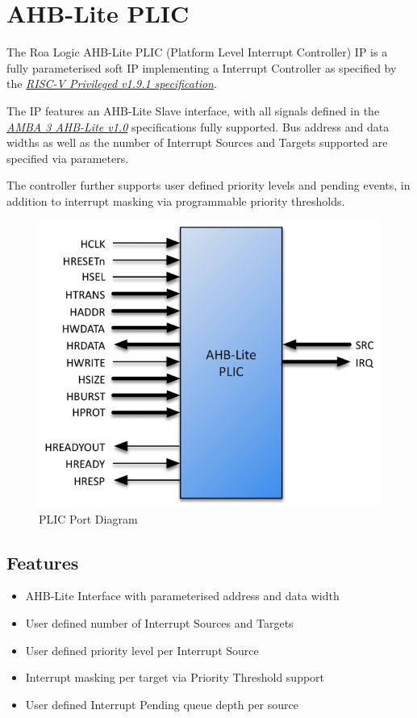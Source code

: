 \section{AHB-Lite PLIC}

The Roa Logic AHB-Lite PLIC (Platform Level Interrupt Controller) IP is a fully parameterised soft IP implementing a Interrupt Controller as specified by the \emph{\href{https://people.eecs.berkeley.edu/\%7Ekrste/papers/riscv-privileged-v1.9.1.pdf}{RISC-V Privileged v1.9.1 specification}}.

The IP features an AHB-Lite Slave interface, with all signals defined in the \emph{\href{https://www.arm.com/products/system-ip/amba-specifications}{AMBA 3 AHB-Lite v1.0}} specifications fully supported. Bus address and data widths as well as the number of Interrupt Sources and Targets supported are specified via parameters.

The controller further supports user defined priority levels and pending events, in addition to interrupt masking via programmable priority thresholds.

\begin{figure}[h]
  \includegraphics{../assets/graphics/AHB-Lite_PLIC_Port_Diagram.png}
  \caption{PLIC Port Diagram}
  \label{fig:PORTDIAG}
\end{figure}

\subsection{Features}

\begin{itemize}
\item
  AHB-Lite Interface with parameterised address and data width
\item
  User defined number of Interrupt Sources and Targets
\item
  User defined priority level per Interrupt Source
\item
  Interrupt masking per target via Priority Threshold support
\item
  User defined Interrupt Pending queue depth per source
\end{itemize}
